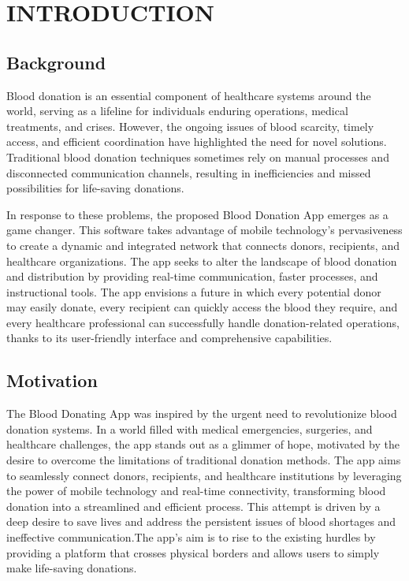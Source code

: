 \chapter{INTRODUCTION}




\section{Background}
Blood donation is an essential component of healthcare systems around the world, serving as a lifeline for individuals enduring operations, medical treatments, and crises. However, the ongoing issues of blood scarcity, timely access, and efficient coordination have highlighted the need for novel solutions. Traditional blood donation techniques sometimes rely on manual processes and disconnected communication channels, resulting in inefficiencies and missed possibilities for life-saving donations.

In response to these problems, the proposed Blood Donation App emerges as a game changer. This software takes advantage of mobile technology's pervasiveness to create a dynamic and integrated network that connects donors, recipients, and healthcare organizations. The app seeks to alter the landscape of blood donation and distribution by providing real-time communication, faster processes, and instructional tools. The app envisions a future in which every potential donor may easily donate, every recipient can quickly access the blood they require, and every healthcare professional can successfully handle donation-related operations, thanks to its user-friendly interface and comprehensive capabilities.

\section{Motivation}
The Blood Donating App was inspired by the urgent need to revolutionize blood donation systems. In a world filled with medical emergencies, surgeries, and healthcare challenges, the app stands out as a glimmer of hope, motivated by the desire to overcome the limitations of traditional donation methods. The app aims to seamlessly connect donors, recipients, and healthcare institutions by leveraging the power of mobile technology and real-time connectivity, transforming blood donation into a streamlined and efficient process. This attempt is driven by a deep desire to save lives and address the persistent issues of blood shortages and ineffective communication.The app's aim is to rise to the existing hurdles by providing a platform that crosses physical borders and allows users to simply make life-saving donations.

